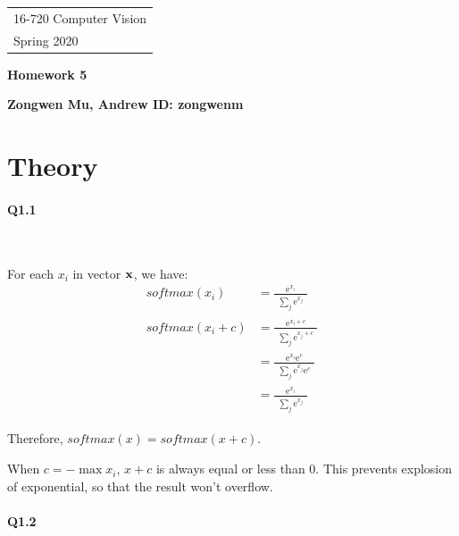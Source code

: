 \documentclass[11pt]{article} \usepackage{fullpage} \usepackage{graphicx} \usepackage{epstopdf} \usepackage{color} \usepackage{psfrag} \usepackage{pdfsync}\usepackage{indentfirst}\usepackage{subfigure}\usepackage{float}\usepackage[section]{placeins}
\begin{document}
{\parindent 0pt \begin{tabular}[t]{l} 16-720 Computer Vision \\ Spring 2020 \end{tabular}}%
\parindent 0pt \parskip 8pt
\begin{center} \large\bf Homework 5 \end{center}
\begin{center} \large\bf Zongwen Mu, Andrew ID: zongwenm \end{center}
\bigskip


\section{Theory}

\setlength{\parindent}{2em}  

\paragraph{Q1.1}~{}

For each $x_i$ in vector $\bold{x}$, we have:
\begin{align}
	softmax\left(x_i\right) & = \frac{\mathrm{e}^{x_i}}{\begin{matrix} \sum_{j} \mathrm{e}^{x_j} \end{matrix}} \\
	softmax\left(x_i + c\right) & = \frac{\mathrm{e}^{x_i+c}}{\begin{matrix} \sum_{j} \mathrm{e}^{x_j+c} \end{matrix}} \\
	& = \frac{\mathrm{e}^{x_i}\mathrm{e}^{c}}{\begin{matrix} \sum_{j} \mathrm{e}^{x_j}\mathrm{e}^{c} \end{matrix}}  \\
	& = \frac{\mathrm{e}^{x_i}}{\begin{matrix} \sum_{j} \mathrm{e}^{x_j} \end{matrix}}
\end{align}

Therefore, $softmax(x) = softmax(x+c)$.

When $c = -\max{x_i}$, $x+c$ is always equal or less than $0$. This prevents explosion of exponential, so that the result won't overflow.

\paragraph{Q1.2}~{}
\end{document}
